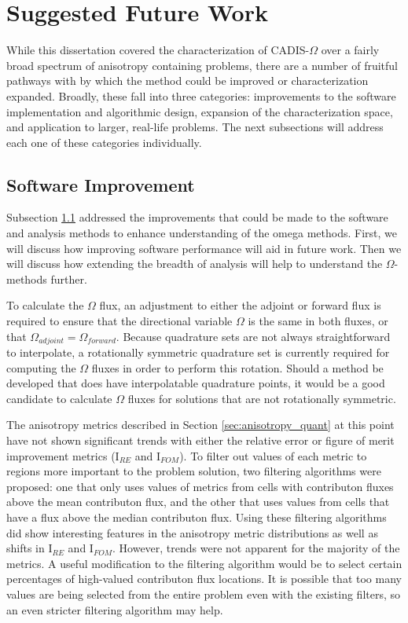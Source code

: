\section{Suggested Future Work}
\label{sec:futurewrk}

While this dissertation covered the characterization of CADIS-$\Omega$ over a
fairly broad spectrum of anisotropy containing problems, there are a number of
fruitful pathways with by which the method could be improved or characterization
expanded. Broadly, these fall into three categories: improvements to the
software implementation and algorithmic design, expansion of the
characterization space, and application to larger, real-life problems. The next
subsections will address each one of these categories individually.

\subsection{Software Improvement}
\label{subsec:softwareimp}

Subsection \ref{subsec:softwareimp}
 addressed the improvements that could be
made to the software and analysis methods to enhance understanding of the omega
methods. First, we will discuss how improving software performance will aid in
future work. Then we will discuss how extending the breadth of analysis will
help to understand the $\Omega$-methods further.

To calculate the $\Omega$ flux, an adjustment to either the adjoint or forward
flux is
required to ensure that the directional variable $\Omega$ is the same in both
fluxes, or that $\Omega_{adjoint} = \Omega_{forward}$. Because quadrature sets
are not always straightforward to interpolate, a rotationally symmetric
quadrature set is currently required for computing the $\Omega$ fluxes in order
to perform this rotation.
Should a method
be developed that does have interpolatable quadrature points, it would be a good
candidate to calculate $\Omega$ fluxes for solutions that are not
rotationally symmetric.

The anisotropy metrics described in Section \ref{sec:anisotropy_quant} at this
point have not shown significant trends with either the relative error or figure
of merit improvement metrics (I$_{RE}$ and I$_{FOM}$). To filter out values of
each metric to regions more important to the problem solution, two filtering
algorithms were proposed: one that only uses values of metrics from cells with
contributon fluxes above the mean contributon flux, and the other that uses
values from cells that have a flux above the median contributon flux. Using
these filtering algorithms did show interesting features in the anisotropy
metric distributions as well as shifts in I$_{RE}$ and I$_{FOM}$. However,
trends were not apparent for the majority of the metrics. A useful modification
to the filtering algorithm would be to select certain percentages of high-valued
contributon flux locations. It is possible that too many values are being
selected from the entire problem even with the existing filters, so an even
stricter filtering algorithm may help.

